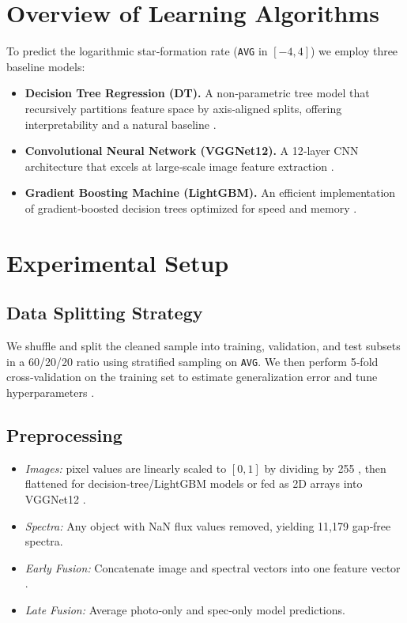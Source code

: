 \documentclass[english,bachelor,oneside]{ctufit-thesis}
\begin{document}
\section{Overview of Learning Algorithms}
To predict the logarithmic star‐formation rate (\texttt{AVG} in $[-4,4]$) we employ three baseline models:
\begin{itemize}
  \item \textbf{Decision Tree Regression (DT).} A non‐parametric tree model that recursively partitions feature space by axis‐aligned splits, offering interpretability and a natural baseline \cite{Hastie2009}.
  \item \textbf{Convolutional Neural Network (VGGNet12).} A 12‐layer CNN architecture that excels at large‐scale image feature extraction \cite{SimonyanZisserman2014}.
  \item \textbf{Gradient Boosting Machine (LightGBM).} An efficient implementation of gradient‐boosted decision trees optimized for speed and memory \cite{Ke2017}.
\end{itemize}

\section{Experimental Setup}

\subsection{Data Splitting Strategy}
We shuffle and split the cleaned sample into training, validation, and test subsets in a 60/20/20 ratio using stratified sampling on \texttt{AVG}. We then perform 5‐fold cross‐validation on the training set to estimate generalization error and tune hyperparameters \cite{Kohavi1995,Pedregosa2011}.

\subsection{Preprocessing}
\begin{itemize}
  \item \textit{Images:} pixel values are linearly scaled to $[0,1]$ by dividing by 255 \cite{krizhevsky2012imagenet}, then flattened for decision‐tree/LightGBM models or fed as 2D arrays into VGGNet12 \cite{pedregosa2011scikit}.
  \item \textit{Spectra:} Any object with NaN flux values removed, yielding 11,179 gap‐free spectra\cite{ivezic2020statistics}.
  \item \textit{Early Fusion:} Concatenate image and spectral vectors into one feature vector \cite{dietterich2000ensemble}.
  \item \textit{Late Fusion:} Average photo‐only and spec‐only model predictions\cite{dietterich2000ensemble}.
\end{itemize}
\end{document}
